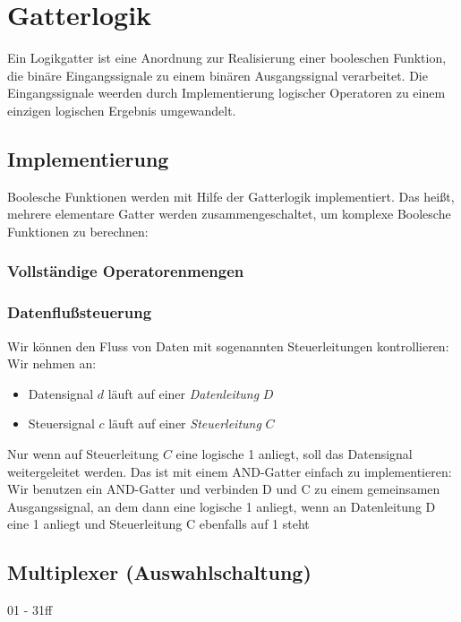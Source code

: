 \documentclass[12pt]{report}
\begin{document}
\section{Gatterlogik}
\begin{defbox}
  Ein Logikgatter ist eine Anordnung zur Realisierung einer booleschen Funktion, die binäre Eingangssignale zu einem binären Ausgangssignal verarbeitet.
  Die Eingangssignale weerden durch Implementierung logischer Operatoren zu einem einzigen logischen Ergebnis umgewandelt.
\end{defbox}

\subsection{Implementierung}
Boolesche Funktionen werden mit Hilfe der Gatterlogik implementiert. 
Das heißt, mehrere elementare Gatter werden zusammengeschaltet, um komplexe Boolesche Funktionen zu berechnen:

\subsubsection{Vollständige Operatorenmengen}

\subsubsection{Datenflußsteuerung}
Wir können den Fluss von Daten mit sogenannten Steuerleitungen kontrollieren:
Wir nehmen an:
\begin{itemize}
  \item Datensignal $d$ läuft auf einer \textit{Datenleitung} $D$
  \item Steuersignal $c$ läuft auf einer \textit{Steuerleitung} $C$
\end{itemize}

Nur wenn auf Steuerleitung $C$ eine logische 1 anliegt, soll das Datensignal weitergeleitet werden.
Das ist mit einem AND-Gatter einfach zu implementieren: 
Wir benutzen ein AND-Gatter und verbinden D und C zu einem gemeinsamen Ausgangssignal, 
an dem dann eine logische 1 anliegt, wenn an Datenleitung D eine 1 anliegt und Steuerleitung C 
ebenfalls auf 1 steht

\subsection{Multiplexer (Auswahlschaltung)}
01 - 31ff
\end{document}
